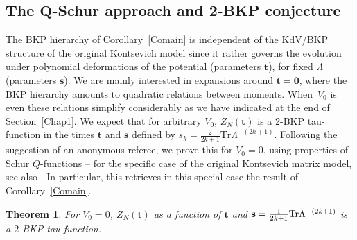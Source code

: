 \documentclass[pdftex]{sigma}
\numberwithin{equation}{section}
\newtheorem{Theorem}{Theorem}[section]
\begin{document}
\subsection[The Q-Schur approach and 2-BKP conjecture]{The $\boldsymbol{Q}$-Schur approach and $\boldsymbol{2}$-BKP conjecture}

The BKP hierarchy of Corollary~\ref{Comain} is independent of the KdV/BKP
structure of the original Kontsevich model
since it rather governs the evolution under polynomial deformations of
the potential (parameters $\mathbf{t}$), for fixed $\Lambda$ (parameters $\mathbf{s}$). We are
mainly interested in expansions around $\mathbf{t} =\boldsymbol{0}$, where the BKP hierarchy amounts to quadratic relations
 between moments. When~$V_0$ is even
these relations simplify considerably as we have indicated at the end of Section~\ref{Chap1}. We expect that for arbitrary $V_0$, $Z_N(\mathbf{t})$ is a 2-BKP tau-function in the times $\mathbf{t}$ and $\mathbf{s}$ defined by $s_k = \frac{2}{2k + 1} \mathrm{Tr} \Lambda^{-(2k + 1)}$. Following the suggestion of an anonymous referee, we prove this for ${V_0 = 0}$, using properties of Schur $Q$-functions -- for the specific case of the original Kontsevich matrix model, see also \cite{LY}. In particular, this retrieves in this special case the result of Corollary~\ref{Comain}.

\begin{Theorem}
\label{2BKP} For $V_0 = 0$, $Z_N(\mathbf{t})$ as a function of $\mathbf{t}$ and $\mathbf{s} = \frac{1}{2k + 1}{\rm Tr}\Lambda^{-(2k + 1)}$ is a $2$-BKP tau-function.
\end{Theorem}
\end{document}
